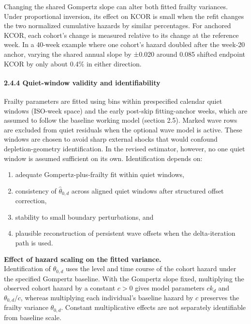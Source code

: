\documentclass[
]{article}
\providecommand{\tightlist}{%
  \setlength{\itemsep}{0pt}\setlength{\parskip}{0pt}}
\begin{document}
Changing the shared Gompertz slope can alter both fitted frailty variances. Under proportional inversion, its effect on KCOR is small when the refit changes the two normalized cumulative hazards by similar percentages. For anchored KCOR, each cohort's change is measured relative to its change at the reference week. In a 40-week example where one cohort's hazard doubled after the week-20 anchor, varying the shared annual slope by ±0.020 around 0.085 shifted endpoint KCOR by only about 0.4\% in either direction.

\paragraph{2.4.4 Quiet-window validity and identifiability}\label{quiet-window-validity-and-identifiability}

Frailty parameters are fitted using bins within prespecified calendar quiet windows (ISO-week space) and the early post-skip fitting-anchor weeks, which are assumed to follow the baseline working model (section 2.5). Marked wave rows are excluded from quiet residuals when the optional wave model is active. These windows are chosen to avoid sharp external shocks that would confound depletion-geometry identification. In the revised estimator, however, no one quiet window is assumed sufficient on its own. Identification depends on:

\begin{enumerate}
\def\labelenumi{\arabic{enumi}.}
\tightlist
\item
  adequate Gompertz-plus-frailty fit within quiet windows,
\item
  consistency of \(\hat{\theta}_{0,d}\) across aligned quiet windows after structured offset correction,
\item
  stability to small boundary perturbations, and
\item
  plausible reconstruction of persistent wave offsets when the delta-iteration path is used.
\end{enumerate}

\textbf{Effect of hazard scaling on the fitted variance.}\\
Identification of \(\theta_{0,d}\) uses the level and time course of the cohort hazard under the specified Gompertz baseline. With the Gompertz slope fixed, multiplying the observed cohort hazard by a constant \(c>0\) gives model parameters \(c k_d\) and \(\theta_{0,d}/c\), whereas multiplying each individual's baseline hazard by \(c\) preserves the frailty variance \(\theta_{0,d}\). Constant multiplicative effects are not separately identifiable from baseline scale.
\end{document}
